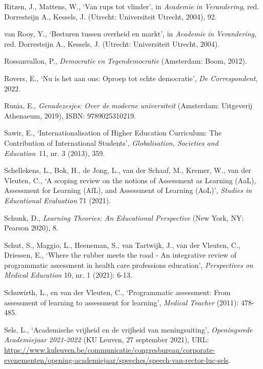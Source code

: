 \documentclass[smallauthor, chapterhaspagenum, nochapterinheader, pagenuminheader,  bigchapnum,medium2, tocpages, garamond, titleinheader]{jote-book}
\begin{document}
\begin{references}
		Ritzen, J., Mattens, W., ‘Van rups tot vlinder', in \emph{Academie}\emph{ in }\emph{Verandering}, red. Dorresteijn A., Kessels, J. (Utrecht: Universiteit Utrecht, 2004), 92.



		van Rooy, Y., ‘Besturen tussen overheid en markt', in \emph{Academie}\emph{ in }\emph{Verandering}, red. Dorresteijn A., Kessels, J. (Utrecht: Universiteit Utrecht, 2004).



		Rossanvallon, P., \emph{Democratie}\emph{ }\emph{en}\emph{ }\emph{Tegendemocratie} (Amsterdam: Boom, 2012).



		Rovers, E., ‘Nu is het aan ons: Oproep tot echte democratie', \emph{De Correspondent}, 2022.



		Runia, E., \emph{Genadezesjes}\emph{: Over de }\emph{moderne}\emph{ }\emph{universiteit} (Amsterdam: Uitgeverij Athenaeum, 2019), ISBN: 9789025310219.



		Sawir, E., ‘Internationalisation of Higher Education Curriculum: The Contribution of International Students', \emph{Globalisation}\emph{, Societies and Education} 11, nr. 3 (2013), 359.



		Schellekens, L., Bok, H., de Jong, L., van der Schaaf, M., Kremer, W., van der Vleuten, C., ‘A scoping review on the notions of Assessment as Learning (AaL), Assessment for Learning (AfL), and Assessment of Learning (AoL)', \emph{Studies in Educational Evaluation} 71 (2021).



		Schunk, D., \emph{Learning Theories: An Educational Perspective} (New York, NY: Pearson 2020), 8.



		Schut, S., Maggio, L., Heeneman, S., van Tartwijk, J., van der Vleuten, C., Driessen, E., ‘Where the rubber meets the road - An integrative review of programmatic assessment in health care professions education', \emph{Perspectives on Medical Education} 10, nr. 1 (2021): 6-13.



		Schuwirth, L., en van der Vleuten, C., ‘Programmatic assessment: From assessment of learning to assessment for learning', \emph{Medical Teacher} (2011): 478-485.



		Sels, L., ‘Academische vrijheid en de vrijheid van meningsuiting', \emph{Openingsrede}\emph{ }\emph{Academiejaar}\emph{ 2021-2022} (KU Leuven, 27 september 2021), URL: \href{https://www.kuleuven.be/communicatie/congresbureau/corporate-evenementen/opening-academiejaar/speeches/speech-van-rector-luc-sels}{https://www.kuleuven.be/communicatie/congresbureau/corporate-evenementen/opening-academiejaar/speeches/speech-van-rector-luc-sels}.




\end{references}
\end{document}
